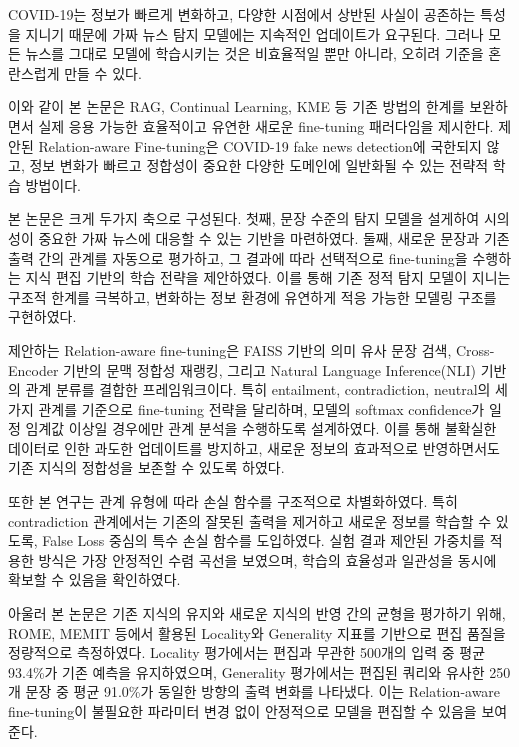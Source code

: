 \documentclass[a4paper,fleqn]{cas-sc}
\begin{document}

COVID-19는 정보가 빠르게 변화하고, 다양한 시점에서 상반된 사실이 공존하는 특성을 지니기 때문에 가짜 뉴스 탐지 모델에는 지속적인 업데이트가 요구된다.
그러나 모든 뉴스를 그대로 모델에 학습시키는 것은 비효율적일 뿐만 아니라, 오히려 기준을 혼란스럽게 만들 수 있다. 

이와 같이 본 논문은 RAG, Continual Learning, KME 등 기존 방법의 한계를 보완하면서 실제 응용 가능한 효율적이고 유연한 새로운 fine-tuning 패러다임을 제시한다. 
제안된 Relation-aware Fine-tuning은 COVID-19 fake news detection에 국한되지 않고, 정보 변화가 빠르고 정합성이 중요한 다양한 도메인에 일반화될 수 있는 전략적 학습 방법이다.

본 논문은 크게 두가지 축으로 구성된다. 첫째, 문장 수준의 탐지 모델을 설게하여 시의성이 중요한 가짜 뉴스에 대응할 수 있는 기반을 마련하였다. 둘째, 새로운 문장과 기존 출력 간의 관계를 자동으로 평가하고, 그 결과에 따라 선택적으로 fine-tuning을 수행하는 지식 편집 기반의 학습 전략을 제안하였다. 이를 통해 기존 정적 탐지 모델이 지니는 구조적 한계를 극복하고, 변화하는 정보 환경에 유연하게 적응 가능한 모델링 구조를 구현하였다. 

제안하는 Relation-aware fine-tuning은 FAISS 기반의 의미 유사 문장 검색, Cross-Encoder 기반의 문맥 정합성 재랭킹, 그리고 Natural Language Inference(NLI) 기반의 관계 분류를 결합한 프레임워크이다. 특히 entailment, contradiction, neutral의 세 가지 관계를 기준으로 fine-tuning 전략을 달리하며, 모델의 softmax confidence가 일정 임계값 이상일 경우에만 관계 분석을 수행하도록 설계하였다. 이를 통해 불확실한 데이터로 인한 과도한 업데이트를 방지하고, 새로운 정보의 효과적으로 반영하면서도 기존 지식의 정합성을 보존할 수 있도록 하였다.


또한 본 연구는 관계 유형에 따라 손실 함수를 구조적으로 차별화하였다. 특히 contradiction 관계에서는 기존의 잘못된 출력을 제거하고 새로운 정보를 학습할 수 있도록, False Loss 중심의 특수 손실 함수를 도입하였다. 실험 결과 제안된 가중치를 적용한 방식은 가장 안정적인 수렴 곡선을 보였으며, 학습의 효율성과 일관성을 동시에 확보할 수 있음을 확인하였다.

아울러 본 논문은 기존 지식의 유지와 새로운 지식의 반영 간의 균형을 평가하기 위해, ROME, MEMIT 등에서 활용된 Locality와 Generality 지표를 기반으로 편집 품질을 정량적으로 측정하였다. Locality 평가에서는 편집과 무관한 500개의 입력 중 평균 93.4\%가 기존 예측을 유지하였으며, Generality 평가에서는 편집된 쿼리와 유사한 250개 문장 중 평균 91.0\%가 동일한 방향의 출력 변화를 나타냈다. 이는 Relation-aware fine-tuning이 불필요한 파라미터 변경 없이 안정적으로 모델을 편집할 수 있음을 보여준다.
\end{document}
